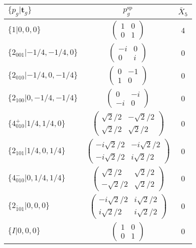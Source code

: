 \documentclass[3p,preprint]{elsarticle}
\newcommand{\bt}{\bm{t}}
\begin{document}
\begin{table}[H]
	\begin{tabular}{|l|c||c|}\hline
		$\{p_g|\bt_g\}$ & $p_g^{\text{sp}}$ & $\bar{X}_5$ \\ \hline \hline
		$\{1|0,0,0\}$ & 				$\left(\begin{array}{cc} 1&0 \\ 0&1 \end{array}\right)$	& $4$  \\ \hline
		$\{2_{001}|-1/4,-1/4,0\}$ &		$\left(\begin{array}{cc} -i&0 \\ 0&i \end{array}\right)$	& $0$  \\ \hline
		$\{2_{010}|-1/4,0,-1/4\}$ &		$\left(\begin{array}{cc} 0&-1 \\ 1&0 \end{array}\right)$	& $0$  \\ \hline
		$\{2_{100}|0,-1/4,-1/4\}$ &		$\left(\begin{array}{cc} 0&-i \\ -i&0 \end{array}\right)$	& $0$  \\ \hline
		$\{4^{+}_{010}|1/4,1/4,0\}$ &	$\left(\begin{array}{cc} \sqrt{2}/2&-\sqrt{2}/2 \\ \sqrt{2}/2&\sqrt{2}/2 \end{array}\right)$	&$0$ \\ \hline
		$\{2_{101}|1/4,0,1/4\}$ &		$\left(\begin{array}{cc} -i\sqrt{2}/2&-i\sqrt{2}/2 \\ -i\sqrt{2}/2&i\sqrt{2}/2 \end{array}\right)$	&$0$ \\ \hline
		$\{4^{-}_{010}|0,1/4,1/4\}$ &		$\left(\begin{array}{cc} \sqrt{2}/2&\sqrt{2}/2 \\ -\sqrt{2}/2&\sqrt{2}/2 \end{array}\right)$	&$0$ \\ \hline
		$\{2_{\bar{1}01}|0,0,0\}$ &		$\left(\begin{array}{cc} -i\sqrt{2}/2&i\sqrt{2}/2 \\ i\sqrt{2}/2&i\sqrt{2}/2 \end{array}\right)$	&$0$ \\ \hline
		$\{I|0,0,0\}$ & 				$\left(\begin{array}{cc} 1&0 \\ 0&1 \end{array}\right)$	& $0$ \\ \hline

\end{tabular}
\end{table}
\end{document}

